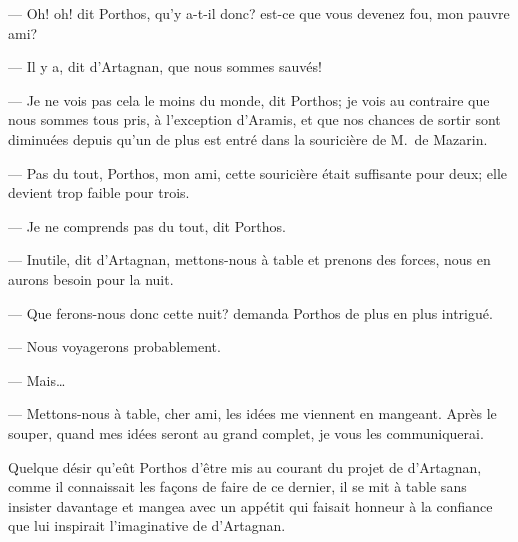 — Oh! oh! dit Porthos, qu'y a-t-il donc? est-ce que vous devenez fou, mon pauvre ami?

— Il y a, dit d'Artagnan, que nous sommes sauvés!

— Je ne vois pas cela le moins du monde, dit Porthos; je vois au contraire que nous sommes tous pris, à l'exception d'Aramis, et que nos chances de sortir sont diminuées depuis qu'un de plus est entré dans la souricière de M.~de Mazarin.

— Pas du tout, Porthos, mon ami, cette souricière était suffisante pour deux; elle devient trop faible pour trois.

— Je ne comprends pas du tout, dit Porthos.

— Inutile, dit d'Artagnan, mettons-nous à table et prenons des forces, nous en aurons besoin pour la nuit.

— Que ferons-nous donc cette nuit? demanda Porthos de plus en plus intrigué.

— Nous voyagerons probablement.

— Mais\dots

— Mettons-nous à table, cher ami, les idées me viennent en mangeant. Après le souper, quand mes idées seront au grand complet, je vous les communiquerai.

Quelque désir qu'eût Porthos d'être mis au courant du projet de d'Artagnan, comme il connaissait les façons de faire de ce dernier, il se mit à table sans insister davantage et mangea avec un appétit qui faisait honneur à la confiance que lui inspirait l'imaginative de d'Artagnan.